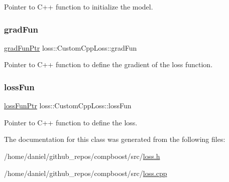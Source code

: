 Pointer to {\ttfamily C++} function to initialize the model. 

\mbox{\label{classloss_1_1_custom_cpp_loss_ad4e80f74715af8955786bf6f5766f24b}} 
\subsubsection{\texorpdfstring{grad\+Fun}{gradFun}}
{\footnotesize\ttfamily \hyperlink{namespaceloss_acae0785d794ff7cc1b1242bab23f81c6}{grad\+Fun\+Ptr} loss\+::\+Custom\+Cpp\+Loss\+::grad\+Fun\hspace{0.3cm}{\ttfamily [private]}}



Pointer to {\ttfamily C++} function to define the gradient of the loss function. 

\mbox{\label{classloss_1_1_custom_cpp_loss_a4745649d71fc6e428f68b2cbc9e343b7}} 
\subsubsection{\texorpdfstring{loss\+Fun}{lossFun}}
{\footnotesize\ttfamily \hyperlink{namespaceloss_a6658cb84c8687d6dd0904c00801542f3}{loss\+Fun\+Ptr} loss\+::\+Custom\+Cpp\+Loss\+::loss\+Fun\hspace{0.3cm}{\ttfamily [private]}}



Pointer to {\ttfamily C++} function to define the loss. 



The documentation for this class was generated from the following files\+:\begin{DoxyCompactItemize}
\item 
/home/daniel/github\+\_\+repos/compboost/src/\hyperlink{loss_8h}{loss.\+h}\item 
/home/daniel/github\+\_\+repos/compboost/src/\hyperlink{loss_8cpp}{loss.\+cpp}\end{DoxyCompactItemize}
